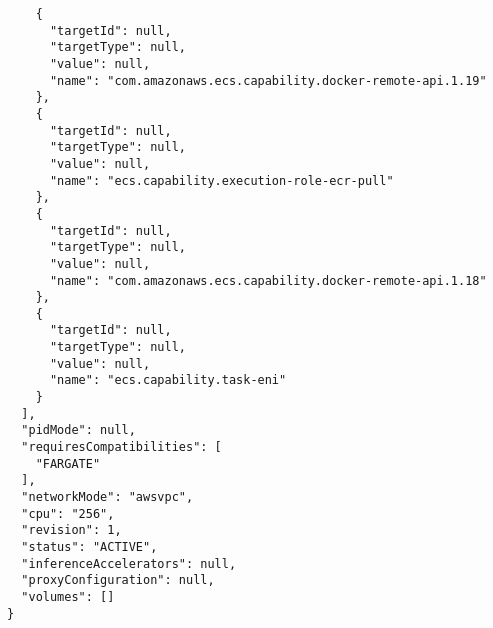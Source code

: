 \begin{verbatim}
    {
      "targetId": null,
      "targetType": null,
      "value": null,
      "name": "com.amazonaws.ecs.capability.docker-remote-api.1.19"
    },
    {
      "targetId": null,
      "targetType": null,
      "value": null,
      "name": "ecs.capability.execution-role-ecr-pull"
    },
    {
      "targetId": null,
      "targetType": null,
      "value": null,
      "name": "com.amazonaws.ecs.capability.docker-remote-api.1.18"
    },
    {
      "targetId": null,
      "targetType": null,
      "value": null,
      "name": "ecs.capability.task-eni"
    }
  ],
  "pidMode": null,
  "requiresCompatibilities": [
    "FARGATE"
  ],
  "networkMode": "awsvpc",
  "cpu": "256",
  "revision": 1,
  "status": "ACTIVE",
  "inferenceAccelerators": null,
  "proxyConfiguration": null,
  "volumes": []
}
\end{verbatim}

